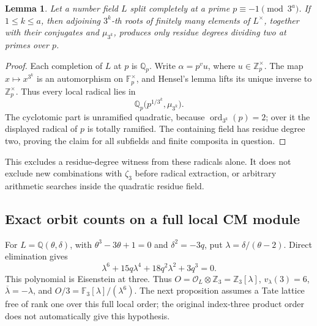 \documentclass[11pt]{article}
\newtheorem{lemma}[theorem]{Lemma}
\theoremstyle{definition}
\theoremstyle{remark}
\begin{document}
\begin{lemma}\label{lem:kummer-split-field-radicals}
Let a number field \(L\) split completely at a prime
\(p\equiv-1\pmod{3^a}\). If \(1\le k\le a\), then
adjoining \(3^k\)-th roots of finitely many elements of
\(L^\times\), together with their conjugates and
\(\mu_{3^k}\), produces only residue degrees dividing two
at primes over \(p\).
\end{lemma}
\begin{proof}
Each completion of \(L\) at \(p\) is \(\mathbb Q_p\).
Write \(\alpha=p^v u\), where \(u\in\mathbb Z_p^\times\).
The map \(x\mapsto x^{3^k}\) is an automorphism on
\(\mathbb F_p^\times\), and Hensel's lemma lifts its
unique inverse to \(\mathbb Z_p^\times\). Thus every local
radical lies in
\[
 \mathbb Q_p\bigl(p^{1/3^k},\mu_{3^k}\bigr).
\]
The cyclotomic part is unramified quadratic, because
\(\operatorname{ord}_{3^k}(p)=2\); over it the displayed
radical of \(p\) is totally ramified. The containing field
has residue degree two, proving the claim for all subfields
and finite composita in question.
\end{proof}

This excludes a residue-degree witness from these radicals
alone. It does not exclude new combinations with \(\zeta_3\)
before radical extraction, or arbitrary arithmetic searches
inside the quadratic residue field.

\subsection{Exact orbit counts on a full local CM module}

For \(L=\mathbb Q(\theta,\delta)\), with
\(\theta^3-3\theta+1=0\) and \(\delta^2=-3q\), put
\(\lambda=\delta/(\theta-2)\). Direct elimination gives
\[
 \lambda^6+15q\lambda^4+18q^2\lambda^2+3q^3=0.
\]
This polynomial is Eisenstein at three. Thus
\(O=\mathcal O_L\otimes\mathbb Z_3=\mathbb Z_3[\lambda]\),
\(v_\lambda(3)=6\), \(\overline\lambda=-\lambda\), and
\(O/3=\mathbb F_3[\lambda]/(\lambda^6)\).
The next proposition assumes a Tate lattice free of rank one
over this full local order; the original index-three product
order does not automatically give this hypothesis.
\end{document}
